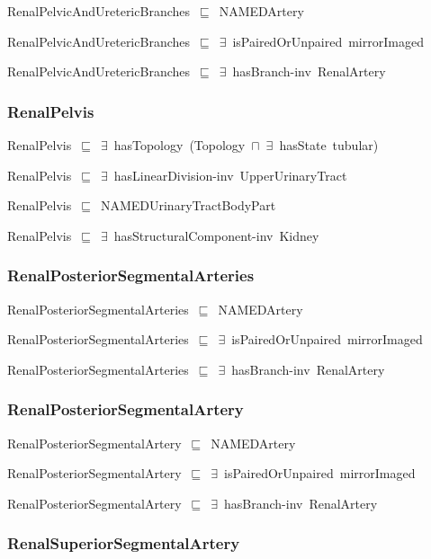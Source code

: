 \documentclass{article}
\begin{document}
RenalPelvicAndUretericBranches~\ensuremath{\sqsubseteq}~NAMEDArtery~

RenalPelvicAndUretericBranches~\ensuremath{\sqsubseteq}~\ensuremath{\exists}~isPairedOrUnpaired~mirrorImaged~

RenalPelvicAndUretericBranches~\ensuremath{\sqsubseteq}~\ensuremath{\exists}~hasBranch-inv~RenalArtery~

\subsubsection*{RenalPelvis}

RenalPelvis~\ensuremath{\sqsubseteq}~\ensuremath{\exists}~hasTopology~(Topology~\ensuremath{\sqcap}~\ensuremath{\exists}~hasState~tubular)~

RenalPelvis~\ensuremath{\sqsubseteq}~\ensuremath{\exists}~hasLinearDivision-inv~UpperUrinaryTract~

RenalPelvis~\ensuremath{\sqsubseteq}~NAMEDUrinaryTractBodyPart~

RenalPelvis~\ensuremath{\sqsubseteq}~\ensuremath{\exists}~hasStructuralComponent-inv~Kidney~

\subsubsection*{RenalPosteriorSegmentalArteries}

RenalPosteriorSegmentalArteries~\ensuremath{\sqsubseteq}~NAMEDArtery~

RenalPosteriorSegmentalArteries~\ensuremath{\sqsubseteq}~\ensuremath{\exists}~isPairedOrUnpaired~mirrorImaged~

RenalPosteriorSegmentalArteries~\ensuremath{\sqsubseteq}~\ensuremath{\exists}~hasBranch-inv~RenalArtery~

\subsubsection*{RenalPosteriorSegmentalArtery}

RenalPosteriorSegmentalArtery~\ensuremath{\sqsubseteq}~NAMEDArtery~

RenalPosteriorSegmentalArtery~\ensuremath{\sqsubseteq}~\ensuremath{\exists}~isPairedOrUnpaired~mirrorImaged~

RenalPosteriorSegmentalArtery~\ensuremath{\sqsubseteq}~\ensuremath{\exists}~hasBranch-inv~RenalArtery~

\subsubsection*{RenalSuperiorSegmentalArtery}
\end{document}
